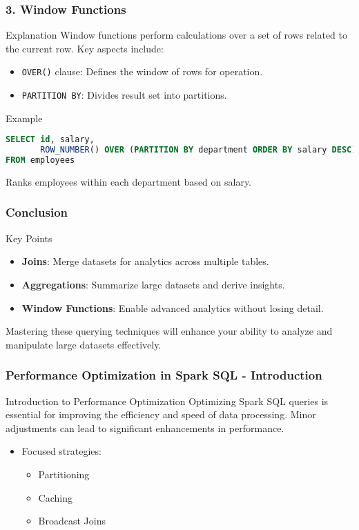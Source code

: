 \documentclass[aspectratio=169]{beamer}
\begin{document}
\begin{frame}[fragile]
    \frametitle{3. Window Functions}
    \begin{block}{Explanation}
        Window functions perform calculations over a set of rows related to the current row. Key aspects include:
        \begin{itemize}
            \item \texttt{OVER()} clause: Defines the window of rows for operation.
            \item \texttt{PARTITION BY}: Divides result set into partitions.
        \end{itemize}
    \end{block}
    \begin{block}{Example}
        \begin{lstlisting}[language=SQL]
SELECT id, salary,
       ROW_NUMBER() OVER (PARTITION BY department ORDER BY salary DESC) AS rank
FROM employees
        \end{lstlisting}
        Ranks employees within each department based on salary.
    \end{block}
\end{frame}

\begin{frame}
    \frametitle{Conclusion}
    \begin{block}{Key Points}
        \begin{itemize}
            \item \textbf{Joins}: Merge datasets for analytics across multiple tables.
            \item \textbf{Aggregations}: Summarize large datasets and derive insights.
            \item \textbf{Window Functions}: Enable advanced analytics without losing detail.
        \end{itemize}
    \end{block}
    Mastering these querying techniques will enhance your ability to analyze and manipulate large datasets effectively.
\end{frame}

\begin{frame}[fragile]
    \frametitle{Performance Optimization in Spark SQL - Introduction}
    \begin{block}{Introduction to Performance Optimization}
        Optimizing Spark SQL queries is essential for improving the efficiency and speed of data processing. Minor adjustments can lead to significant enhancements in performance.
    \end{block}
    \begin{itemize}
        \item Focused strategies: 
            \begin{itemize}
                \item Partitioning
                \item Caching
                \item Broadcast Joins
            \end{itemize}
    \end{itemize}
\end{frame}
\end{document}
